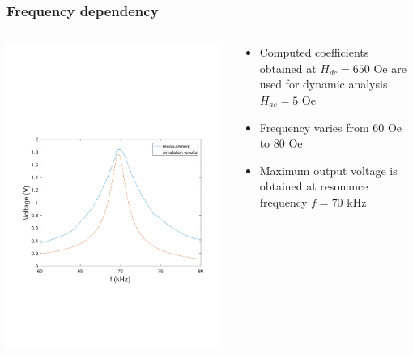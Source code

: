 \documentclass[compress]{beamer}
\begin{document}
\begin{frame}\frametitle{Frequency dependency}
\begin{columns}[totalwidth=\textwidth]
 \begin{column}{.69\textwidth}
 \includegraphics[width=0.99\textwidth]{Graphic/03_volta_dyna_recta.pdf}
 \end{column}
 \begin{column}{.30\textwidth}
 \begin{itemize}[label=$\bullet$, font=\small, leftmargin=*]
 \item Computed coefficients obtained at $H_{dc} = 650$ Oe are used for dynamic analysis $H_{ac} = 5$ Oe
 \item Frequency varies from 60 Oe to 80 Oe
 \item Maximum output voltage is obtained at resonance frequency $f=70$ kHz
 \end{itemize}
 \end{column}
\end{columns}
\end{frame}
\end{document}
